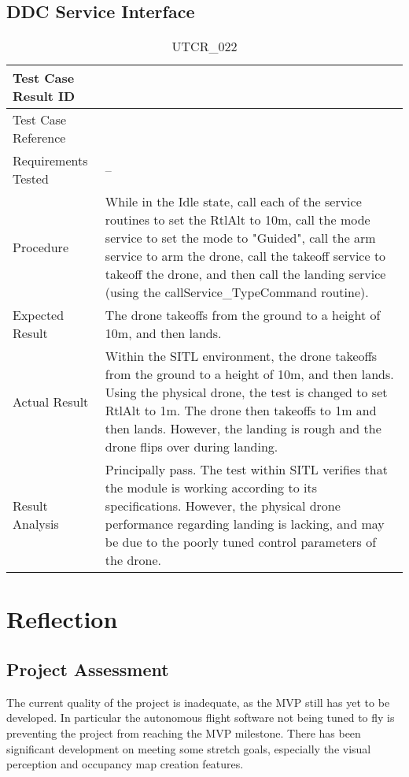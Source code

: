 \documentclass[12pt, titlepage]{article}
\begin{document}
\clearpage

\subsection{DDC Service Interface}
\label{ddcServiceInterface}

\begin{table}[!h]
\begin{center}
\caption {UTCR\_022}
\label{tab:UTCR_022}
\begin{tabular}{ | m{3.2cm} | m{12.2cm} | } 
\hline
Test Case Result ID & \nameref{tab:UTCR_022} \\ 
\hline
Test Case Reference & \nameref{tab:UTC_022}  \\ 
\hline
Requirements Tested & -- \\ 
\hline
Procedure & While in the Idle state, call each of the service routines to set the RtlAlt to 10m, call the mode service to set the mode to "Guided", call the arm service to arm the drone, call the takeoff service to takeoff the drone, and then call the landing service (using the callService_TypeCommand routine). \\ 
\hline
Expected Result & The drone takeoffs from the ground to a height of 10m, and then lands. \\
\hline
Actual Result & Within the SITL environment, the drone takeoffs from the ground to a height of 10m, and then lands. Using the physical drone, the test is changed to set RtlAlt to 1m. The drone then takeoffs to 1m and then lands. However, the landing is rough and the drone flips over during landing. \\
\hline
Result Analysis & Principally pass. The test within SITL verifies that the module is working according to its specifications. However, the physical drone performance regarding landing is lacking, and may be due to the poorly tuned control parameters of the drone. \\ 
\hline
\end{tabular}
\end{center}
\end{table}

\clearpage

\section{Reflection}
\subsection{Project Assessment}
The current quality of the project is inadequate, as the MVP still has yet to be developed. In particular the autonomous flight software not being tuned to fly is preventing the project from reaching the MVP milestone. There has been significant development on meeting some stretch goals, especially the visual perception and occupancy map creation features.
\end{document}
